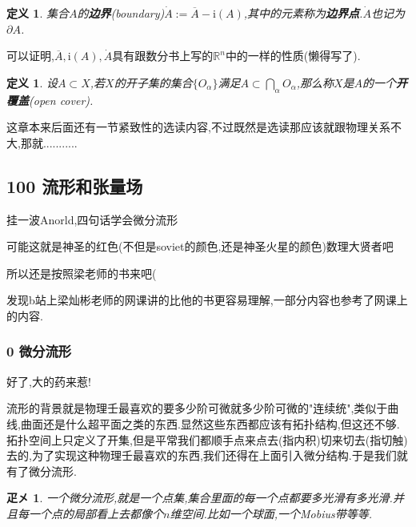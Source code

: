 \documentclass[UTF8]{article}
\newcommand{\im}{\mathrm{i}}
\begin{document}
	\newtheorem{boundary}{定义}
	
	\begin{boundary}
		集合$A$的\textbf{边界}(boundary)$\dot{A}:=\overline{A}-\im(A)$,其中的元素称为\textbf{边界点}.$\dot{A}$也记为$\partial A$.
	\end{boundary}
	
	可以证明,$\overline{A}, \im(A), \dot{A}$具有跟数分书上写的$\mathbb{R}^n$中的一样的性质(懒得写了).
	
	\newtheorem*{openCover}{定义}
	
	\begin{openCover}
		设$A \subset X$,若$X$的开子集的集合$\{O_{\alpha}\}$满足$A \subset \bigcap_{\alpha} O_{\alpha}$,那么称$X$是$A$的一个\textbf{开覆盖}(open cover).
	\end{openCover}
	
	这章本来后面还有一节紧致性的选读内容,不过既然是选读那应该就跟物理关系不大,那就...........
	
	
	\newpage	
	
	
	
	
	
	
\subsection*{100 流形和张量场}
	
	挂一波Anorld,\quad 四\quad 句\quad 话\quad 学\quad 会\quad 微\quad 分\quad 流\quad 形
	
	可能这就是神圣的红色(不但是soviet的颜色,还是神圣火星的颜色)数理大贤者吧
	
	所以还是按照梁老师的书来吧(
	
	发现b站上梁灿彬老师的网课讲的比他的书更容易理解,一部分内容也参考了网课上的内容.
	
\subsubsection*{0 微分流形}
	
	好了,大\quad 的\quad 药\quad 来\quad 惹\quad !
	
	流形的背景就是物理壬最喜欢的要多少阶可微就多少阶可微的"连续统",类似于曲线,曲面还是什么超平面之类的东西.显然这些东西都应该有拓扑结构,但这还不够.拓扑空间上只定义了开集,但是平常我们都顺手点来点去(指内积)切来切去(指切触)去的,为了实现这种物理壬最喜欢的东西,我们还得在上面引入微分结构.于是我们就有了微分流形.
	
	\newtheorem*{easyManifold}{疋㐅\cite{Hassani}}
	
	\begin{easyManifold}
		一个微分流形,就是一个点集,集合里面的每一个点都要多光滑有多光滑.并且每一个点的局部看上去都像个$n$维空间.比如一个球面,一个Mobius带等等.
	\end{easyManifold}
	
\end{document}
